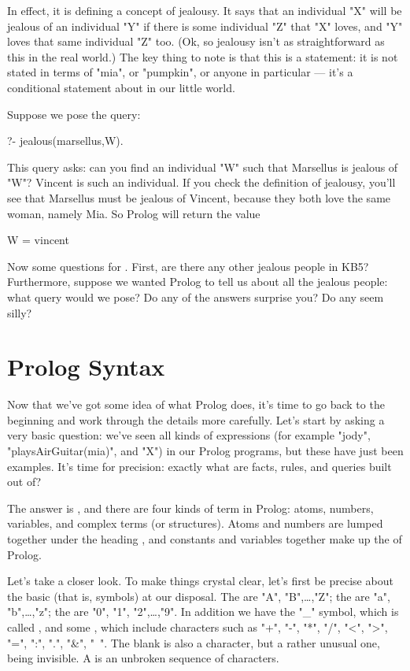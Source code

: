 In effect, it is defining a concept of jealousy.  It says that an
individual "X" will be jealous of an individual "Y" if there is some
individual "Z" that "X" loves, and "Y" loves that same individual "Z"
too. (Ok, so jealousy isn't as straightforward as this in the real
world.) The key thing to note is that this is a 
statement: it is not stated in terms of "mia", or "pumpkin", or anyone
in particular --- it's a conditional statement about
 in our little world.

Suppose we pose the query:
%
\begin{LPNcodedisplay}
?- jealous(marsellus,W).
\end{LPNcodedisplay}
%
This query asks: can you find an individual "W" such that Marsellus is
jealous of "W"?  Vincent is such an individual.  If you check the
definition of jealousy, you'll see that Marsellus must be jealous of
Vincent, because they both love the same woman, namely Mia. So Prolog
will return the value
%
\begin{LPNcodedisplay}
W = vincent
\end{LPNcodedisplay}


Now some questions for . First, are there any other
jealous people in KB5? Furthermore, suppose we wanted Prolog to tell
us about all the jealous people: what query would we pose? Do any of
the answers surprise you? Do any seem silly?



\section{Prolog Syntax}\label{SEC.L1.SYNTAX}

Now that we've got some idea of what Prolog does, it's time to go back
to the beginning and work through the details more carefully. Let's
start by asking a very basic question: we've seen all kinds of
expressions (for example "jody", "playsAirGuitar(mia)", and "X") in
our Prolog programs, but these have just been examples.  It's time for
precision: exactly what are facts, rules, and queries built out of?

The answer is , and there are four kinds of term in
Prolog: atoms, numbers, variables, and complex terms (or structures).
Atoms and numbers are lumped together under the heading
, and constants and variables together make up the
 of Prolog.

Let's take a closer look. To make things crystal clear, let's first be
precise about the basic  (that is, symbols) at our
disposal.  The  are "A", "B",\ldots,"Z";
the  are "a", "b",\ldots,"z"; the
 are "0", "1", "2",\ldots,"9". In addition we have the "\_"
symbol, which is called , and some , which include characters such as "+", "-", "*", "/",
"<", ">", "=", ":", ".", "\&", "~".  The blank  is also
a character, but a rather unusual one, being invisible. A
 is an unbroken sequence of characters.




